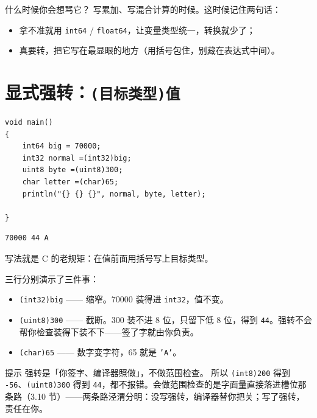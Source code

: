 什么时候你会想骂它？ 写累加、写混合计算的时候。这时候记住两句话：

\begin{itemize}

\item 拿不准就用 \texttt{int64} / \texttt{float64}，让变量类型统一，转换就少了；

\item 真要转，把它写在最显眼的地方（用括号包住，别藏在表达式中间）。

\end{itemize}

\section{显式强转：\texttt{(\allowbreak{}目标类型)\allowbreak{}值}}

\par
\medskip
\begin{lstlisting}[style=chali]
void main()
{
    int64 big = 70000;
    int32 normal =(int32)big;
    uint8 byte =(uint8)300;
    char letter =(char)65;
    println("{} {} {}", normal, byte, letter);

}
\end{lstlisting}
\par
\medskip

\par
\medskip
\begin{lstlisting}[style=out]
70000 44 A
\end{lstlisting}
\par
\medskip

写法就是 C 的老规矩：在值前面用括号写上目标类型。

三行分别演示了三件事：

\begin{itemize}

\item \texttt{(\allowbreak{}int32)\allowbreak{}big} —— 缩窄。70000 装得进 \texttt{int32}，值不变。

\item \texttt{(\allowbreak{}uint8)\allowbreak{}300} —— 截断。300 装不进 8 位，只留下低 8 位，得到 \texttt{44}。强转不会帮你检查装得下装不下——签了字就由你负责。

\item \texttt{(\allowbreak{}char)\allowbreak{}65} —— 数字变字符，65 就是 \texttt{'A'}。

\end{itemize}

\begin{tip}{提示}
强转是「你签字、编译器照做」，不做范围检查。 所以 \texttt{(\allowbreak{}int8)\allowbreak{}200} 得到 \texttt{-56}、\texttt{(\allowbreak{}uint8)\allowbreak{}300} 得到 \texttt{44}，都不报错。会做范围检查的是字面量直接落进槽位那条路（3.10 节）——两条路泾渭分明：没写强转，编译器替你把关；写了强转，责任在你。
\end{tip}

